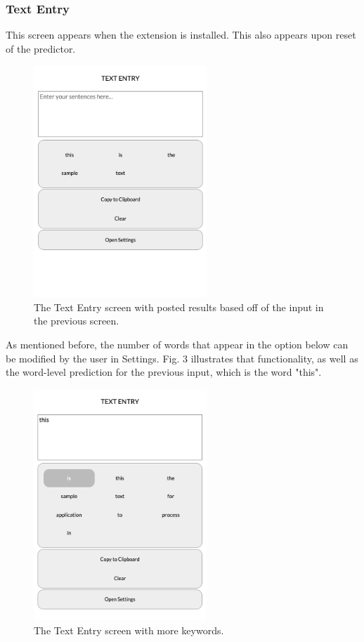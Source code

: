 \documentclass[journal]{./IEEE/IEEEtran}
\begin{document}
\subsubsection{Text Entry}
This screen appears when the extension is installed. This also appears upon reset of the predictor.

\begin{figure}[!ht]
\begin{center}

\includegraphics[width=65mm]{images/initial-text-entry.png}
\caption{The Text Entry screen with posted results based off of the input in the previous screen.}

\end{center}
\end{figure}

As mentioned before, the number of words that appear in the option below can be modified by the user in Settings. Fig. 3 illustrates that functionality, as well as the word-level prediction for the previous input, which is the word "this".

\begin{figure}[!ht]
\begin{center}

\includegraphics[width=65mm]{images/word-level-prediction.png}
\caption{The Text Entry screen with more keywords.}

\end{center}
\end{figure}
\end{document}
